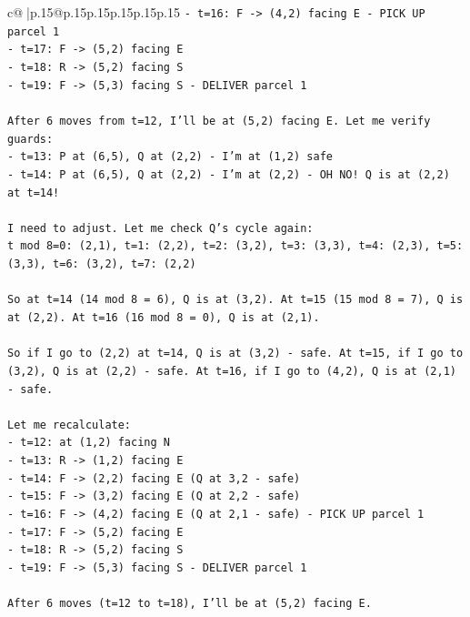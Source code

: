 \documentclass{article}
\begin{document}
{\begin{supertabular}{c@{$\;$}|p{.15\linewidth}@{}p{.15\linewidth}p{.15\linewidth}p{.15\linewidth}p{.15\linewidth}p{.15\linewidth}}
{{{\texttt{{-} t=16: F {-}> (4,2) facing E {-} PICK UP parcel 1} \\
\texttt{{-} t=17: F {-}> (5,2) facing E} \\
\texttt{{-} t=18: R {-}> (5,2) facing S} \\
\texttt{{-} t=19: F {-}> (5,3) facing S {-} DELIVER parcel 1} \\
\\ 
\texttt{After 6 moves from t=12, I'll be at (5,2) facing E. Let me verify guards:} \\
\texttt{{-} t=13: P at (6,5), Q at (2,2) {-} I'm at (1,2) safe} \\
\texttt{{-} t=14: P at (6,5), Q at (2,2) {-} I'm at (2,2) {-} OH NO! Q is at (2,2) at t=14!} \\
\\ 
\texttt{I need to adjust. Let me check Q's cycle again:} \\
\texttt{t mod 8=0: (2,1), t=1: (2,2), t=2: (3,2), t=3: (3,3), t=4: (2,3), t=5: (3,3), t=6: (3,2), t=7: (2,2)} \\
\\ 
\texttt{So at t=14 (14 mod 8 = 6), Q is at (3,2). At t=15 (15 mod 8 = 7), Q is at (2,2). At t=16 (16 mod 8 = 0), Q is at (2,1).} \\
\\ 
\texttt{So if I go to (2,2) at t=14, Q is at (3,2) {-} safe. At t=15, if I go to (3,2), Q is at (2,2) {-} safe. At t=16, if I go to (4,2), Q is at (2,1) {-} safe.} \\
\\ 
\texttt{Let me recalculate:} \\
\texttt{{-} t=12: at (1,2) facing N} \\
\texttt{{-} t=13: R {-}> (1,2) facing E} \\
\texttt{{-} t=14: F {-}> (2,2) facing E (Q at 3,2 {-} safe)} \\
\texttt{{-} t=15: F {-}> (3,2) facing E (Q at 2,2 {-} safe)} \\
\texttt{{-} t=16: F {-}> (4,2) facing E (Q at 2,1 {-} safe) {-} PICK UP parcel 1} \\
\texttt{{-} t=17: F {-}> (5,2) facing E} \\
\texttt{{-} t=18: R {-}> (5,2) facing S} \\
\texttt{{-} t=19: F {-}> (5,3) facing S {-} DELIVER parcel 1} \\
\\ 
\texttt{After 6 moves (t=12 to t=18), I'll be at (5,2) facing E.} \\
\\ 
}}}
\end{supertabular}}
\end{document}

